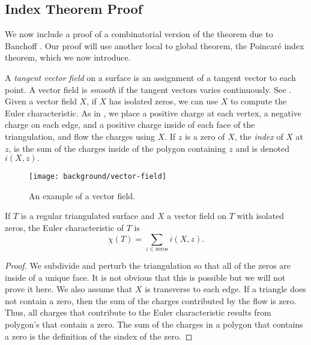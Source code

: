 \subsection{Index Theorem Proof}
We now include a proof of a combinatorial version of the theorem due to Banchoff
\cite{banchoff_critical_1970}. Our proof will use another local to global theorem,
the Poincar\'e index theorem, which we now introduce.

A \emph{tangent vector field} on a surface is an assignment of a tangent
vector to each point. A vector field is \emph{smooth} if the tangent vectors
varies continuously. See .
Given a vector field $X$, if $X$ has isolated zeros, we
can use $X$ to compute the Euler characteristic.
As in , we place a positive charge at each vertex, a negative charge on
each edge, and a positive charge inside of each face of the triangulation, and flow
the charges using $X$. If $z$ is a zero of $X$, the \emph{index} of $X$ at $z$,
is the sum of the charges inside of the polygon containing $z$ and is denoted
$i(X,z).$

 \begin{figure}[htb]
         \centering
         \texttt{[image: background/vector-field]}
	\caption{An example of a vector field.
	\label{fig:vector-field}}
 \end{figure}
 

\begin{theorem} \label{thm:poincare-index}

If $T$ is a regular triangulated surface and $X$ a vector field on $T$ with isolated zeros,
the Euler characteristic of $T$ is 
$$\chi(T)=\sum_{z\in \text{zeros}}i(X,z).$$
\end{theorem}

\begin{proof}
We subdivide and perturb the triangulation so that all of the zeros are inside of a unique face.
It is not obvious that this is possible but we will not prove it here.
We also assume that $X$ is transverse to each edge.
If a triangle does not contain a zero, then the sum of the charges
contributed by the flow is zero.
Thus, all charges that contribute to the Euler characteristic
results from polygon's that contain a zero.
The sum of the charges in a polygon that contains a zero is the definition of the sindex
of the zero.

\end{proof}

